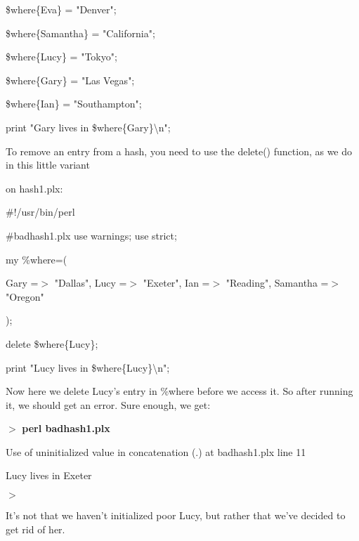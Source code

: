 \documentclass[a4paper,11pt]{book}
\begin{document}
\noindent 

\noindent \$where\{Eva\} = "Denver";

\noindent \$where\{Samantha\} = "California";

\noindent \$where\{Lucy\} = "Tokyo";

\noindent \$where\{Gary\} = "Las Vegas";

\noindent \$where\{Ian\} = "Southampton";

\noindent 

\noindent print "Gary lives in \$where\{Gary\}\textbackslash n";

\noindent 

\noindent To remove an entry from a hash, you need to use the delete() function, as we do in this little variant

\noindent on hash1.plx:

\noindent 

\noindent 

\noindent \#!/usr/bin/perl

\noindent \#badhash1.plx use warnings; use strict;

\noindent 

\noindent my \%where=(

\noindent Gary =$>$ "Dallas", Lucy =$>$ "Exeter", Ian =$>$ "Reading", Samantha =$>$ "Oregon"

\noindent );

\noindent 

\noindent delete \$where\{Lucy\};

\noindent print "Lucy lives in \$where\{Lucy\}\textbackslash n";

\noindent 

\noindent Now here we delete Lucy's entry in \%where before we access it. So after running it, we should get an error. Sure enough, we get:

\noindent 

\noindent $>$ \textbf{perl badhash1.plx}

\noindent Use of uninitialized value in concatenation (.) at badhash1.plx line 11

\noindent Lucy lives in Exeter

\noindent $>$

\noindent 

\noindent It's not that we haven't initialized poor Lucy, but rather that we've decided to get rid of her.

\noindent 

\noindent 
\end{document}
